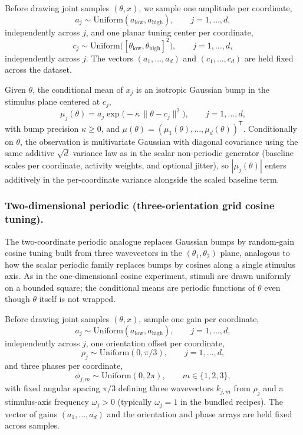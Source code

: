 Before drawing joint samples $(\theta,x)$, we sample one amplitude per coordinate,
\begin{equation}
  a_j \sim \mathrm{Uniform}(a_{\mathrm{low}}, a_{\mathrm{high}}),
  \qquad j = 1,\ldots,d,
\end{equation}
independently across $j$, and one planar tuning center per coordinate,
\begin{equation}
  c_j \sim \mathrm{Uniform}\bigl([\theta_{\mathrm{low}},\theta_{\mathrm{high}}]^2\bigr),
  \qquad j = 1,\ldots,d,
\end{equation}
independently across $j$.
The vectors $(a_1,\ldots,a_d)$ and $(c_1,\ldots,c_d)$ are held fixed across the dataset.

Given $\theta$, the conditional mean of $x_j$ is an isotropic Gaussian bump in the stimulus plane centered at $c_j$,
\begin{equation}
  \mu_j(\theta)
  =
  a_j \exp\!\bigl(-\kappa\,\|\theta-c_j\|^2\bigr),
  \qquad j = 1,\ldots,d,
\end{equation}
with bump precision $\kappa\ge 0$, and $\mu(\theta)=(\mu_1(\theta),\ldots,\mu_d(\theta))^{\mathsf{T}}$.
Conditionally on $\theta$, the observation is multivariate Gaussian with diagonal covariance using the same additive $\sqrt{d}$ variance law as in the scalar non-periodic generator (baseline scales per coordinate, activity weights, and optional jitter), so $|\mu_j(\theta)|$ enters additively in the per-coordinate variance alongside the scaled baseline term.

\subsubsection{Two-dimensional periodic (three-orientation grid cosine tuning).}
The two-coordinate periodic analogue replaces Gaussian bumps by random-gain cosine tuning built from three wavevectors in the $(\theta_1,\theta_2)$ plane, analogous to how the scalar periodic family replaces bumps by cosines along a single stimulus axis.
As in the one-dimensional cosine experiment, stimuli are drawn uniformly on a bounded square; the conditional means are periodic functions of $\theta$ even though $\theta$ itself is not wrapped.

Before drawing joint samples $(\theta,x)$, sample one gain per coordinate,
\begin{equation}
  a_j \sim \mathrm{Uniform}(a_{\mathrm{low}}, a_{\mathrm{high}}),
  \qquad j = 1,\ldots,d,
\end{equation}
independently across $j$, one orientation offset per coordinate,
\begin{equation}
  \rho_j \sim \mathrm{Uniform}(0,\pi/3),
  \qquad j = 1,\ldots,d,
\end{equation}
and three phases per coordinate,
\begin{equation}
  \phi_{j,m}\sim \mathrm{Uniform}(0,2\pi),
  \qquad m\in\{1,2,3\},
\end{equation}
with fixed angular spacing $\pi/3$ defining three wavevectors $k_{j,m}$ from $\rho_j$ and a stimulus-axis frequency $\omega_j>0$ (typically $\omega_j=1$ in the bundled recipes).
The vector of gains $(a_1,\ldots,a_d)$ and the orientation and phase arrays are held fixed across samples.

